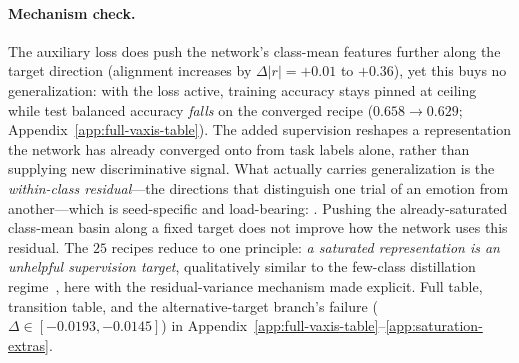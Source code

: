 \paragraph{Mechanism check.} The auxiliary loss does push the network's
class-mean features further along the target direction (alignment
increases by $\Delta|r|=+0.01$ to $+0.36$), yet this buys no
generalization: with the loss active, training accuracy stays pinned
at ceiling while test balanced accuracy \emph{falls} on the converged
recipe ($0.658\!\to\!0.629$; Appendix~\ref{app:full-vaxis-table}). The added supervision reshapes a representation
the network has already converged onto from task labels alone, rather
than supplying new discriminative signal. What actually carries
generalization is the \emph{within-class residual}---the directions
that distinguish one trial of an emotion from another---which is
seed-specific and load-bearing: . Pushing the already-saturated class-mean basin
along a fixed target does not improve how the
network uses this residual.
The $25$ recipes reduce to one principle: \emph{a saturated
representation is an unhelpful supervision target}, qualitatively
similar to the few-class distillation
regime~\citep{muller2020subclass,loo2024lelp,yuan2020revisitkd},
here with the residual-variance mechanism made explicit. Full table,
transition table, and the alternative-target branch's failure
($\Delta\in[-0.0193,-0.0145]$) in
Appendix~\ref{app:full-vaxis-table}--\ref{app:saturation-extras}.
